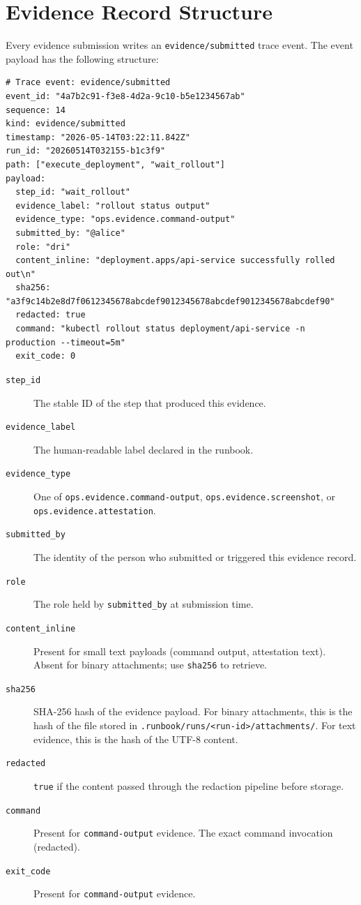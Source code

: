 \section{Evidence Record Structure}
\label{sec:evidence-record-structure}

Every evidence submission writes an \texttt{evidence/submitted} trace event. The event
payload has the following structure:

\begin{verbatim}
# Trace event: evidence/submitted
event_id: "4a7b2c91-f3e8-4d2a-9c10-b5e1234567ab"
sequence: 14
kind: evidence/submitted
timestamp: "2026-05-14T03:22:11.842Z"
run_id: "20260514T032155-b1c3f9"
path: ["execute_deployment", "wait_rollout"]
payload:
  step_id: "wait_rollout"
  evidence_label: "rollout status output"
  evidence_type: "ops.evidence.command-output"
  submitted_by: "@alice"
  role: "dri"
  content_inline: "deployment.apps/api-service successfully rolled out\n"
  sha256: "a3f9c14b2e8d7f0612345678abcdef9012345678abcdef9012345678abcdef90"
  redacted: true
  command: "kubectl rollout status deployment/api-service -n production --timeout=5m"
  exit_code: 0
\end{verbatim}

\begin{description}
  \item[\texttt{step\_id}] The stable ID of the step that produced this evidence.
  \item[\texttt{evidence\_label}] The human-readable label declared in the runbook.
  \item[\texttt{evidence\_type}] One of \texttt{ops.evidence.command-output},
    \texttt{ops.evidence.screenshot}, or \texttt{ops.evidence.attestation}.
  \item[\texttt{submitted\_by}] The identity of the person who submitted or triggered
    this evidence record.
  \item[\texttt{role}] The role held by \texttt{submitted\_by} at submission time.
  \item[\texttt{content\_inline}] Present for small text payloads (command output,
    attestation text). Absent for binary attachments; use \texttt{sha256} to retrieve.
  \item[\texttt{sha256}] SHA-256 hash of the evidence payload. For binary attachments,
    this is the hash of the file stored in \texttt{.runbook/runs/<run-id>/attachments/}.
    For text evidence, this is the hash of the UTF-8 content.
  \item[\texttt{redacted}] \texttt{true} if the content passed through the redaction
    pipeline before storage.
  \item[\texttt{command}] Present for \texttt{command-output} evidence. The exact command
    invocation (redacted).
  \item[\texttt{exit\_code}] Present for \texttt{command-output} evidence.
\end{description}

